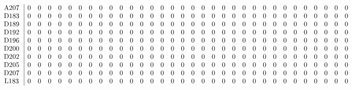 \begin{table}[H]
\begin{center}
\begin{math}
\begin{array}{c|cccccccccccccccccccccccccccccccc}
\mathrm{A207} \hspace*{2pt} &  0 &  0 &  0 &  0 &  0 &  0 &  0 &  0 &  0 &  0 &  0 &  0 &  0 &  0 &  0 &  0 &  0 &  0 &  0 &  0 &  0 &  0 &  0 &  0 &  0 &  0 &  0 &  0 &  0 &  0 &  0 &  0 \\
\mathrm{D183} \hspace*{2pt} &  0 &  0 &  0 &  0 &  0 &  0 &  0 &  0 &  0 &  0 &  0 &  0 &  0 &  0 &  0 &  0 &  0 &  0 &  0 &  0 &  0 &  0 &  0 &  0 &  0 &  0 &  0 &  0 &  0 &  0 &  0 &  0 \\
\mathrm{D189} \hspace*{2pt} &  0 &  0 &  0 &  0 &  0 &  0 &  0 &  0 &  0 &  0 &  0 &  0 &  0 &  0 &  0 &  0 &  0 &  0 &  0 &  0 &  0 &  0 &  0 &  0 &  0 &  0 &  0 &  0 &  0 &  0 &  0 &  0 \\
\mathrm{D192} \hspace*{2pt} &  0 &  0 &  0 &  0 &  0 &  0 &  0 &  0 &  0 &  0 &  0 &  0 &  0 &  0 &  0 &  0 &  0 &  0 &  0 &  0 &  0 &  0 &  0 &  0 &  0 &  0 &  0 &  0 &  0 &  0 &  0 &  0 \\
\mathrm{D196} \hspace*{2pt} &  0 &  0 &  0 &  0 &  0 &  0 &  0 &  0 &  0 &  0 &  0 &  0 &  0 &  0 &  0 &  0 &  0 &  0 &  0 &  0 &  0 &  0 &  0 &  0 &  0 &  0 &  0 &  0 &  0 &  0 &  0 &  0 \\
\mathrm{D200} \hspace*{2pt} &  0 &  0 &  0 &  0 &  0 &  0 &  0 &  0 &  0 &  0 &  0 &  0 &  0 &  0 &  0 &  0 &  0 &  0 &  0 &  0 &  0 &  0 &  0 &  0 &  0 &  0 &  0 &  0 &  0 &  0 &  0 &  0 \\
\mathrm{D202} \hspace*{2pt} &  0 &  0 &  0 &  0 &  0 &  0 &  0 &  0 &  0 &  0 &  0 &  0 &  0 &  0 &  0 &  0 &  0 &  0 &  0 &  0 &  0 &  0 &  0 &  0 &  0 &  0 &  0 &  0 &  0 &  0 &  0 &  0 \\
\mathrm{D205} \hspace*{2pt} &  0 &  0 &  0 &  0 &  0 &  0 &  0 &  0 &  0 &  0 &  0 &  0 &  0 &  0 &  0 &  0 &  0 &  0 &  0 &  0 &  0 &  0 &  0 &  0 &  0 &  0 &  0 &  0 &  0 &  0 &  0 &  0 \\
\mathrm{D207} \hspace*{2pt} &  0 &  0 &  0 &  0 &  0 &  0 &  0 &  0 &  0 &  0 &  0 &  0 &  0 &  0 &  0 &  0 &  0 &  0 &  0 &  0 &  0 &  0 &  0 &  0 &  0 &  0 &  0 &  0 &  0 &  0 &  0 &  0 \\
\mathrm{L183} \hspace*{2pt} &  0 &  0 &  0 &  0 &  0 &  0 &  0 &  0 &  0 &  0 &  0 &  0 &  0 &  0 &  0 &  0 &  0 &  0 &  0 &  0 &  0 &  0 &  0 &  0 &  0 &  0 &  0 &  0 &  0 &  0 &  0 &  0 \\

\end{array}
\end{math}
\end{center}
\end{table}

